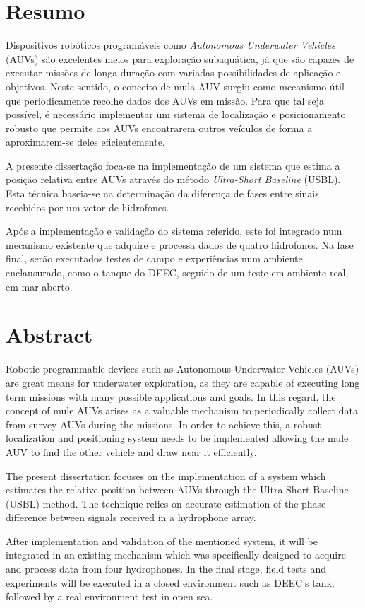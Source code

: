\chapter*{Resumo}
Dispositivos robóticos programáveis como \textit{Autonomous Underwater Vehicles} (AUVs) são excelentes meios para exploração subaquática, já que são capazes de executar missões de longa duração com variadas possibilidades de aplicação e objetivos. Neste sentido, o conceito de mula AUV surgiu como mecanismo útil que periodicamente recolhe dados dos AUVs em missão. Para que tal seja possível, é necessário implementar um sistema de localização e posicionamento robusto que permite aos AUVs encontrarem outros veículos de forma a aproximarem-se deles eficientemente.

A presente dissertação foca-se na implementação de um sistema que estima a posição relativa entre AUVs através do método \textit{Ultra-Short Baseline} (USBL). Esta técnica baseia-se na determinação da diferença de fases entre sinais recebidos por um vetor de hidrofones.

Após a implementação e validação do sistema referido, este foi integrado num mecanismo existente que adquire e processa dados de quatro hidrofones. Na fase final, serão executados testes de campo e experiências num ambiente enclausurado, como o tanque do DEEC, seguido de um teste em ambiente real, em mar aberto.


\chapter*{Abstract}
Robotic programmable devices such as Autonomous Underwater Vehicles (AUVs) are great means for underwater exploration, as they are capable of executing long term missions with many possible applications and goals. In this regard, the concept of mule AUVs arises as a valuable mechanism to periodically collect data from survey AUVs during the missions. In order to achieve this, a robust localization and positioning system needs to be implemented allowing the mule AUV to find the other vehicle and draw near it efficiently.

The present dissertation focuses on the implementation of a system which estimates the relative position between AUVs through the Ultra-Short Baseline (USBL) method. The technique relies on accurate estimation of the phase difference between signals received in a hydrophone array. 

After implementation and validation of the mentioned system, it will be integrated in an existing mechanism which was specifically designed to acquire and process data from four hydrophones. In the final stage, field tests and experiments will be executed in a closed environment such as DEEC's tank, followed by a real environment test in open sea.